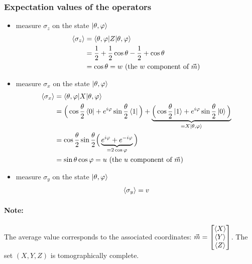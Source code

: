 \documentclass{article}
\begin{document}
\subsubsection*{Expectation values of the operators}
\begin{itemize}[label=-]
    \item measure $\sigma_z$ on the state $\ket{\theta, \varphi}$
    \begin{equation}
        \begin{aligned}
            \braket{\sigma_z}
                & = \braket{\theta, \varphi|Z|\theta, \varphi} \\
                & = \frac{1}{2} + \frac{1}{2}\cos\theta - \frac{1}{2} + \cos\theta \\
                & = \cos \theta = w \text{  (the $w$ component of $\vec{m}$)}
        \end{aligned}
    \end{equation}
    \item measure $\sigma_x$ on the state $\ket{\theta, \varphi}$
    \begin{equation}
        \begin{aligned}
            \braket{\sigma_x}
                & = \braket{\theta, \varphi|X|\theta, \varphi} \\
                & = \Big(\cos\frac{\theta}{2}\bra{0}+e^{i\varphi}\sin\frac{\theta}{2}\bra{1}\Big)
                    + \underbrace{\Big(\cos\frac{\theta}{2}\ket{1}+e^{i\varphi}\sin\frac{\theta}{2}
                    \ket{0}\Big)}_{=X\ket{\theta, \varphi}} \\
                & = \cos\frac{\theta}{2}\sin\frac{\theta}{2}
                    \Big(\underbrace{e^{i\varphi}+e^{-i\varphi}}_{=2\cos\varphi}\Big)\\
                & = \sin\theta\cos\varphi = u \text{  (the $u$ component of $\vec{m}$)}
        \end{aligned}
    \end{equation}
    \item measure $\sigma_y$ on the state $\ket{\theta, \varphi}$
    \begin{equation}
        \begin{aligned}
            \braket{\sigma_y} = v
        \end{aligned}
    \end{equation}
\end{itemize}


\paragraph{Note: } The average value corresponds to the associated coordinates:
 $\vec{m} = \begin{bmatrix}
    \braket{X} \\ \braket{Y} \\ \braket{Z}
\end{bmatrix}$. The set $(X, Y, Z)$ is tomographically complete.
\end{document}
